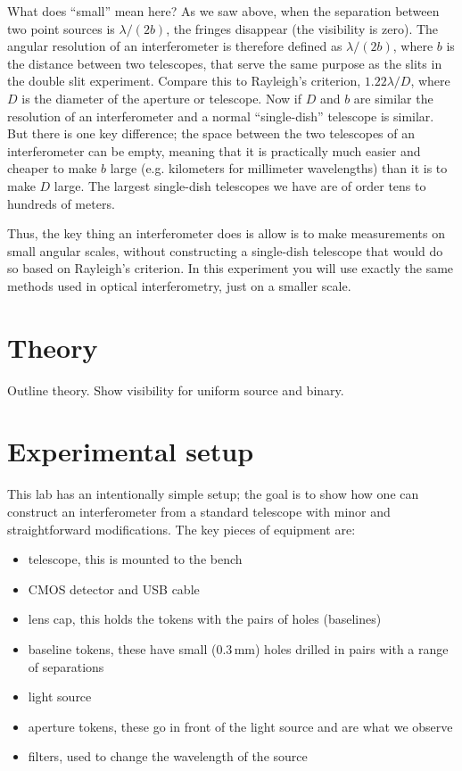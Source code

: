 \documentclass[11pt]{article}
\begin{document}
What does ``small'' mean here? As we saw above, when the separation between two point sources is $\lambda/(2b)$, the fringes disappear (the visibility is zero). The angular resolution of an interferometer is therefore defined as $\lambda/(2b)$, where $b$ is the distance between two telescopes, that serve the same purpose as the slits in the double slit experiment. Compare this to Rayleigh's criterion, $1.22 \lambda/D$, where $D$ is the diameter of the aperture or telescope. Now if $D$ and $b$ are similar the resolution of an interferometer and a normal ``single-dish'' telescope is similar. But there is one key difference; the space between the two telescopes of an interferometer can be empty, meaning that it is practically much easier and cheaper to make $b$ large (e.g. kilometers for millimeter wavelengths) than it is to make $D$ large. The largest single-dish telescopes we have are of order tens to hundreds of meters.

Thus, the key thing an interferometer does is allow is to make measurements on small angular scales, without constructing a single-dish telescope that would do so based on Rayleigh's criterion. In this experiment you will use exactly the same methods used in optical interferometry, just on a smaller scale.

\section{Theory}

Outline theory. Show visibility for uniform source and binary.

\section{Experimental setup}

This lab has an intentionally simple setup; the goal is to show how one can construct an interferometer from a standard telescope with minor and straightforward modifications. The key pieces of equipment are:
\begin{itemize}
    \item telescope, this is mounted to the bench
    \item CMOS detector and USB cable
    \item lens cap, this holds the tokens with the pairs of holes (baselines)
    \item baseline tokens, these have small (0.3\,mm) holes drilled in pairs with a range of separations
    \item light source
    \item aperture tokens, these go in front of the light source and are what we observe
    \item filters, used to change the wavelength of the source
\end{itemize}
\end{document}
